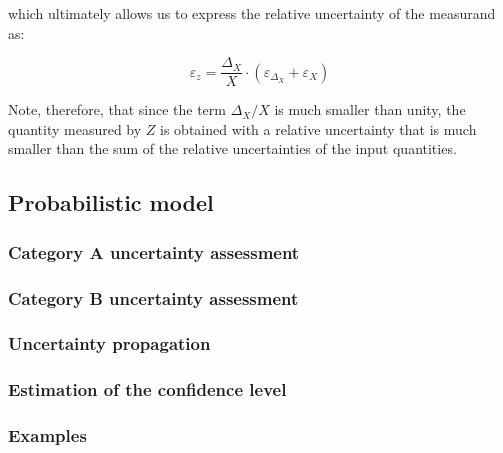 \documentclass[../main.tex]{subfiles}
\begin{document}
which ultimately allows us to express the relative uncertainty of the measurand as:

\begin{equation}
	\varepsilon_z = \frac{\Delta_X}{X} \cdot (\varepsilon_{\Delta_X} + \varepsilon_X) 
\end{equation}

Note, therefore, that since the term $\Delta_X / X$ is much smaller than unity, the quantity measured by $Z$ is obtained with a relative uncertainty that is much smaller than the sum of the relative uncertainties of the input quantities.

\subsection{Probabilistic model}



\subsubsection{Category A uncertainty assessment}
\subsubsection{Category B uncertainty assessment}
\subsubsection{Uncertainty propagation}
\subsubsection{Estimation of the confidence level}
\subsubsection{Examples}




























\end{document}

